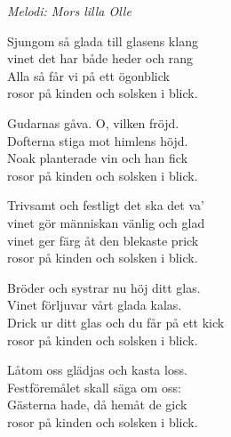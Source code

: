{\footnotesize\textit{Melodi: Mors lilla Olle}}\par
\vspace{10pt}
Sjungom så glada till glasens klang\\
vinet det har både heder och rang\\
Alla så får vi på ett ögonblick\\
rosor på kinden och solsken i blick.\par
\vspace{10pt}
Gudarnas gåva. O, vilken fröjd.\\
Dofterna stiga mot himlens höjd.\\
Noak planterade vin och han fick\\
rosor på kinden och solsken i blick.\par
\vspace{10pt}
Trivsamt och festligt det ska det va'\\
vinet gör människan vänlig och glad\\
vinet ger färg åt den blekaste prick\\
rosor på kinden och solsken i blick.\par
\vspace{10pt}
Bröder och systrar nu höj ditt glas.\\
Vinet förljuvar vårt glada kalas.\\
Drick ur ditt glas och du får på ett kick\\
rosor på kinden och solsken i blick.\par
\vspace{10pt}
Låtom oss glädjas och kasta loss.\\
Festföremålet skall säga om oss:\\
Gästerna hade, då hemåt de gick\\
rosor på kinden och solsken i blick.
